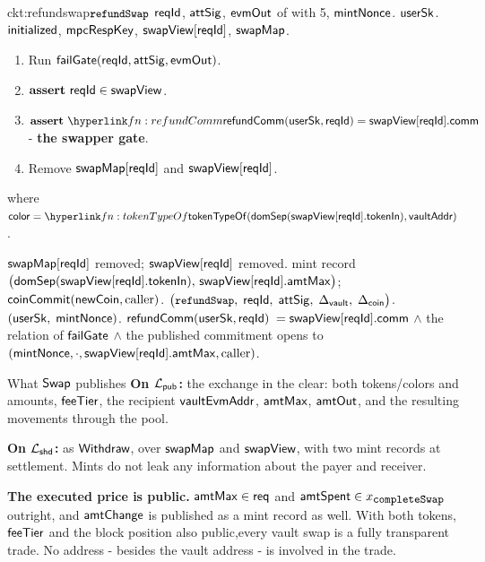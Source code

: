 \begin{CktBox}{ckt:refundswap}{$\texttt{\small refundSwap}$ }
 $\mathsf{reqId}$, $\mathsf{attSig}$, $\mathsf{evmOut}$ of with 5, $\mathsf{mintNonce}$.
 $\mathsf{userSk}$.
 $\mathsf{initialized}$, $\mathsf{mpcRespKey}$, $\mathsf{swapView}[\mathsf{reqId}]$, $\mathsf{swapMap}$.
\begin{enumerate}[nosep,leftmargin=1.7em,topsep=2pt]
\item Run \hyperref[ckt:failgate]{$\mathsf{failGate}(\mathsf{reqId}, \mathsf{attSig}, \mathsf{evmOut})$}.
\item $\textbf{assert}~ \mathsf{reqId} \in \mathsf{swapView}$.
\item $\assert \lnk{fn:refundComm}{\refundComm(\usersk, \rid)} = \swapView[\rid].\fComm$ -
      \textbf{the swapper gate}.
\item Remove $\mathsf{swapMap}[\mathsf{reqId}]$ and $\mathsf{swapView}[\mathsf{reqId}]$.
\end{enumerate}
where $\mathsf{color}= \lnk{fn:tokenTypeOf}{\tokenTypeOf(\domSep(\swapView[\rid].\fTokIn),
\vaultAddr)}$.
\begin{OutList}
\oitem{\Dvault} $\mathsf{swapMap}[\mathsf{reqId}]$ removed; $\mathsf{swapView}[\mathsf{reqId}]$ removed.
\oitem{\Dshd} \bluedot mint record
  $\bigl(\mathsf{domSep}(\mathsf{swapView}[\mathsf{reqId}].\mathsf{tokenIn}),\, \mathsf{swapView}[\mathsf{reqId}].\mathsf{amtMax}\bigr)$; \;
  \bluedot $\mathsf{coinCommit}(\mathsf{newCoin}, \text{caller})$.
\oitem{\stmt} $\bigl(\texttt{\small refundSwap},\; \mathsf{reqId},\; \mathsf{attSig},\; \Delta_{\mathsf{vault}},\; \Delta_{\mathsf{coin}}\bigr)$.
\oitem{\wit} $(\mathsf{userSk},\; \mathsf{mintNonce})$.
\oitem{\Rel} $\mathsf{refundComm}(\mathsf{userSk}, \mathsf{reqId})$ $= \mathsf{swapView}[\mathsf{reqId}].\mathsf{comm}$ \;$\wedge$\; the relation of
  $\mathsf{failGate}$ \;$\wedge$\; the published commitment opens to
  $(\mathsf{mintNonce}, \cdot, \mathsf{swapView}[\mathsf{reqId}].\mathsf{amtMax}, \text{caller})$.
\end{OutList}
\end{CktBox}


\begin{PubBox}{What $\mathsf{Swap}$ publishes}
\textbf{On $\mathcal{L}_{\mathsf{pub}}$:} the exchange in the clear: both tokens/colors and amounts, $\mathsf{feeTier}$, the recipient $\mathsf{vaultEvmAddr}$, $\mathsf{amtMax}$, $\mathsf{amtOut}$, and the resulting movements through the pool.

\smallskip
\textbf{On $\mathcal{L}_{\mathsf{shd}}$:} as $\mathsf{Withdraw}$, over $\mathsf{swapMap}$ and $\mathsf{swapView}$, with two mint
records at settlement. Mints do not leak any information about the payer and receiver.

\smallskip
\textbf{The executed price is public.} $\mathsf{amtMax} \in \mathsf{req}$ and $\mathsf{amtSpent} \in x_{\texttt{\small completeSwap}}$
outright, and $\mathsf{amtChange}$ is published as a mint record as well. With both tokens, $\mathsf{feeTier}$ and the block position also public,every vault swap is a
fully transparent trade.  No address -  besides the vault address  - is involved in the trade.
\end{PubBox}


